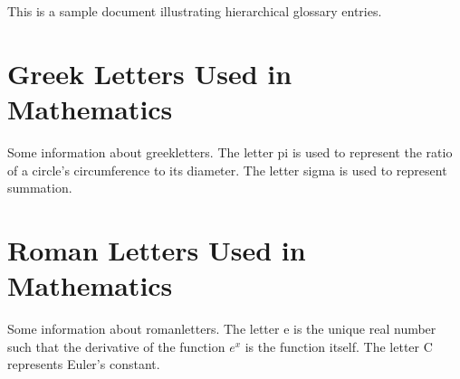 \documentclass{report}
\begin{document}
This is a sample document illustrating hierarchical glossary
entries.

\chapter{Greek Letters Used in Mathematics}

Some information about \glspl{greekletter}.
The letter \gls{pi} is used to represent the ratio of a circle's
circumference to its diameter.
The letter \gls{sigma} is used to represent summation.

\chapter{Roman Letters Used in Mathematics}

Some information about \glspl{romanletter}.
The letter \gls{e} is the unique real number such that
the derivative of the function $e^x$ is the function itself.
The letter \gls{C} represents Euler's constant.

\printglossaries
\end{document}
